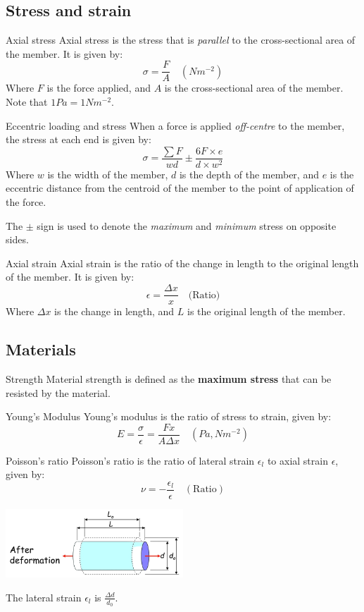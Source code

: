 \subsection{Stress and strain}
\begin{definition}
    {Axial stress}
    Axial stress is the stress that is \emph{parallel} to the cross-sectional area of the member. It is given by:
    \[\sigma=\frac{F}{A}\quad(Nm^{-2})\]
    Where $F$ is the force applied, and $A$ is the cross-sectional area of the member. Note that $1 Pa = 1 Nm^{-2}$.
\end{definition}
\begin{theorem}
    {Eccentric loading and stress}
    When a force is applied \emph{off-centre} to the member, the stress at each end is given by:
    \[\sigma=\frac{\sum F}{wd}\pm \frac{6F\times e}{d\times w^2}\]
    Where $w$ is the width of the member, $d$ is the depth of the member, and $e$ is the eccentric distance from the centroid of the member to the point of application of the force.

    The $\pm$ sign is used to denote the \emph{maximum} and \emph{minimum} stress on opposite sides.
\end{theorem}
\begin{definition}
    {Axial strain}
    Axial strain is the ratio of the change in length to the original length of the member. It is given by:
    \[\epsilon=\frac{\Delta x}{x}\quad\text{(Ratio)}\]
    Where $\Delta x$ is the change in length, and $L$ is the original length of the member.
\end{definition}


\subsection{Materials}
\begin{definition}
    {Strength}
    Material strength is defined as the \textbf{maximum stress} that can be resisted by the material.
\end{definition}
\begin{definition}
    {Young's Modulus}
    Young's modulus is the ratio of stress to strain, given by:
    \[E=\frac{\sigma}{\epsilon}=\frac{Fx}{A\Delta x}\quad(Pa, Nm^{-2})\]
\end{definition}
\begin{definition}
    {Poisson's ratio}
    Poisson's ratio is the ratio of lateral strain $\epsilon_l$ to axial strain $\epsilon$, given by:
    \[\nu=-\frac{\epsilon_l}{\epsilon}\quad(\text{Ratio})\]
    \tcblower
    \begin{center}
        \includegraphics[width=0.5\textwidth]{./img/poisson.png}

        The lateral strain $\epsilon_l$ is $\frac{\Delta d}{d_0}$.
    \end{center}
\end{definition}

